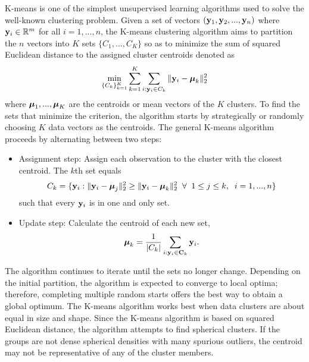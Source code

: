 K-means is one of the simplest unsupervised learning algorithms used to solve the well-known clustering problem. Given a set of vectors $(\mathbf y_{1},\mathbf y_{2},...,\mathbf y_{n})$ where $\mathbf y_{i}\in\mathbb{R}^{m}$ for all $i=1,...,n$, the K-means clustering algorithm aims to partition the $n$ vectors into $K$ sets $\{C_{1},...,C_{K}\}$ so as to minimize the sum of squared Euclidean distance to the assigned cluster centroids denoted as
$$\min_{\{C_{k}\}_{k=1}^{K}}\sum_{k=1}^{K}\sum_{i: \mathbf y_{i}\in C_{k}}\|\mathbf y_{i} -\boldsymbol \mu_{k}\|_{2}^{2}$$
where $\boldsymbol\mu_{1},...,\boldsymbol\mu_{K}$ are the centroids or mean vectors of the $K$ clusters. To find the sets that minimize the criterion, the algorithm starts by strategically or randomly choosing $K$ data vectors as the centroids. The general K-means algorithm proceeds by alternating between two steps:
\begin{itemize}
\item Assignment step: Assign each observation to the cluster with the closest centroid. The $k$th set equals
$$ C_{k} = \{\mathbf y_{i}: \|\mathbf y_{i} - \boldsymbol\mu_{j}\|_{2}^{2}\geq \|\mathbf y_{i} - \boldsymbol\mu_{k}\|_{2}^{2} \;\;\forall\;\; 1\leq j\leq k,\;\; i=1,...,n\}$$
such that every $\mathbf y_{i}$ is in one and only set.
\item Update step: Calculate the centroid of each new  set,
$$\boldsymbol\mu_{k} = \frac{1}{|C_{k}|}\sum_{i: \mathbf y_{i}\in\mathbf C_{k}} \mathbf y_{i}.$$
\end{itemize}
The algorithm continues to iterate until the sets no longer change. Depending on the initial partition, the algorithm is expected to converge to local optima; therefore, completing multiple random starts offers the best way to obtain a global optimum. The K-means algorithm works best when data clusters are about equal in size and shape. Since the K-means algorithm is based on squared Euclidean distance, the algorithm attempts to find spherical clusters. If the groups are not dense spherical densities with many spurious outliers, the centroid may not be representative of any of the cluster members.

